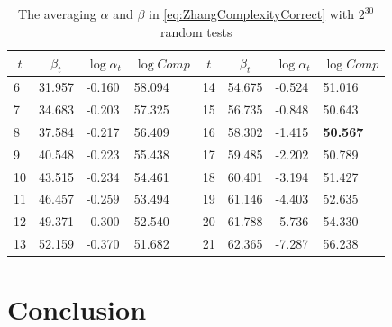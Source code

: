 \begin{table}[htbp]
  \centering
  \caption{The averaging $\alpha$ and $\beta$ in \eqref{eq:ZhangComplexityCorrect} with $2^{30}$ random tests}\label{tab:ZhangAlphaAndBeta}
    \begin{tabular}{|l|l|l|l|l|l|l|l|}
    \hline
    \multicolumn{1}{|c|}{$t$} & \multicolumn{1}{c|}{$\beta_t$} & \multicolumn{1}{c|}{$\log\alpha_t$} & \multicolumn{1}{c|}{$\log Comp$} & \multicolumn{1}{c|}{$t$} & \multicolumn{1}{c|}{$\beta_t$} & \multicolumn{1}{c|}{$\log\alpha_t$} & \multicolumn{1}{c|}{$\log Comp$} \\
    \hline

    6    & 31.957 & -0.160 & 58.094 & 14    & 54.675 & -0.524 &  51.016\\
    \hline
    7    & 34.683 & -0.203 & 57.325 & 15    & 56.735 & -0.848 &  50.643\\
    \hline
    8    & 37.584 & -0.217 & 56.409 & 16    & 58.302 & -1.415 &  \textbf{50.567}\\
    \hline
    9    &  40.548 & -0.223 & 55.438 & 17    & 59.485 & -2.202 &  50.789\\
    \hline
    10    & 43.515 & -0.234 & 54.461 & 18    & 60.401 & -3.194 &  51.427\\
    \hline
    11    & 46.457 & -0.259 & 53.494 & 19    & 61.146 & -4.403 &  52.635\\
    \hline
    12    & 49.371 & -0.300 & 52.540 & 20    & 61.788 & -5.736 &  54.330\\
    \hline
    13    & 52.159 & -0.370 & 51.682 & 21    & 62.365 & -7.287 &  56.238\\
    \hline
    \end{tabular}%
\end{table}%




\section{Conclusion}





\ifLNCSVER
  
\else
  
\fi





\ifLNCSVER

\else

\fi






